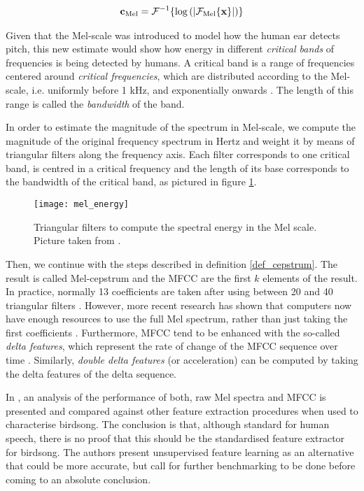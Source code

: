 \documentclass[../main.tex]{subfiles} \label{chapter_soa}
\begin{document}
\begin{align*}
\mathbf{c}_{\text{Mel}} = \mathcal{F}^{-1}\{\log{(\lvert\mathcal{F}_{\text{Mel}}\{\mathbf{x}\}\rvert)}\}
\end{align*}
\par Given that the Mel-scale was introduced to model how the human ear detects pitch, this new estimate would show how energy in different \emph{critical bands} of frequencies is being detected by humans. A critical band is a range of frequencies centered around \emph{critical frequencies}, which are distributed according to the Mel-scale, i.e. uniformly before 1 kHz, and exponentially onwards \cite{Gutierrez-Osuna2009}. The length of this range is called the \emph{bandwidth} of the band.
\par In order to estimate the magnitude of the spectrum in Mel-scale, we compute the magnitude of the original frequency spectrum in Hertz and weight it by means of triangular filters along the frequency axis. Each filter corresponds to one critical band, is centred in a critical frequency and the length of its base corresponds to the bandwidth of the critical band, as pictured in figure \ref{mel_energy}.


\begin{figure}[t]
\texttt{[image: mel\_energy]}
\caption{Triangular filters to compute the spectral energy in the Mel scale. Picture taken from \cite{Sludge2000}.}
\label{mel_energy}
\end{figure}

\par Then, we continue with the steps described in definition \ref{def_cepstrum}. The result is called Mel-cepstrum and the MFCC are the first $k$ elements of the result. In practice, normally 13 coefficients are taken after using between 20 and 40 triangular filters \cite{Gutierrez-Osuna2009}. However, more recent research has shown that computers now have enough resources to use the full Mel spectrum, rather than just taking the first coefficients \cite{Stowell2014}. Furthermore, MFCC tend to be enhanced with the so-called \emph{delta features}, which represent the rate of change of the MFCC sequence over time \cite{Muda2010} \cite{Lyons2014}. Similarly, \emph{double delta features} (or acceleration) can be computed by taking the delta features of the delta sequence. 
\par In \cite{Stowell2014}, an analysis of the performance of both, raw Mel spectra and MFCC is presented and compared against other feature extraction procedures when used to characterise birdsong. The conclusion is that, although standard for human speech, there is no proof that this should be the standardised feature extractor for birdsong. The authors present unsupervised feature learning as an alternative that could be more accurate, but call for further benchmarking to be done before coming to an absolute conclusion.
\end{document}
